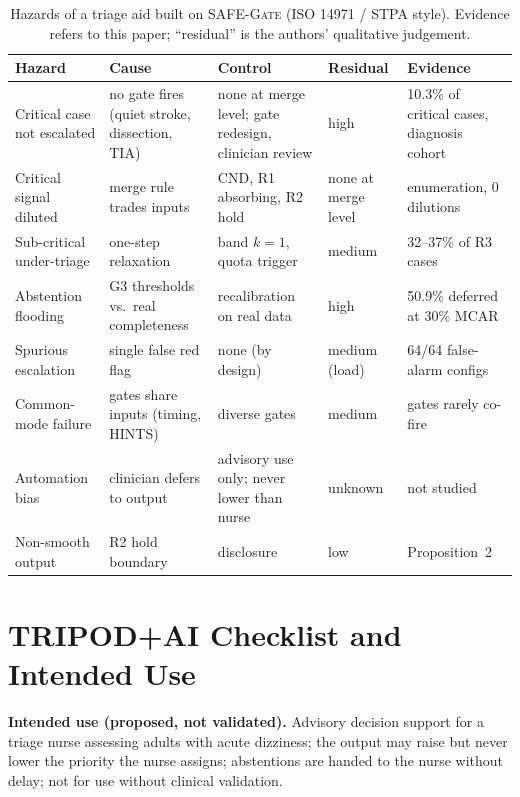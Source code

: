 \documentclass[11pt,a4paper]{article}%
\newcommand{\safegate}{\textsc{SAFE-Gate}}
\theoremstyle{plain}%
\theoremstyle{remark}%
\begin{document}
\begin{table}[h]
\caption{Hazards of a triage aid built on \safegate{} (ISO 14971 / STPA style). Evidence refers to this paper; ``residual'' is the authors' qualitative judgement.}\label{tab:hazard}
\footnotesize
\begin{tabular}{@{}p{}p{}p{}p{}p{}@{}}
\toprule
Hazard & Cause & Control & Residual & Evidence \\
\midrule
Critical case not escalated & no gate fires (quiet stroke, dissection, TIA) & none at merge level; gate redesign, clinician review & high & 10.3\% of critical cases, diagnosis cohort \\
Critical signal diluted & merge rule trades inputs & CND, R1 absorbing, R2 hold & none at merge level & enumeration, 0 dilutions \\
Sub-critical under-triage & one-step relaxation & band $k=1$, quota trigger & medium & 32--37\% of R3 cases \\
Abstention flooding & G3 thresholds vs.\ real completeness & recalibration on real data & high & 50.9\% deferred at 30\% MCAR \\
Spurious escalation & single false red flag & none (by design) & medium (load) & 64/64 false-alarm configs \\
Common-mode failure & gates share inputs (timing, HINTS) & diverse gates & medium & gates rarely co-fire \\
Automation bias & clinician defers to output & advisory use only; never lower than nurse & unknown & not studied \\
Non-smooth output & R2 hold boundary & disclosure & low & Proposition~2 \\
\bottomrule
\end{tabular}
\end{table}

\section{TRIPOD+AI Checklist and Intended Use}\label{sup:tripod}

\textbf{Intended use (proposed, not validated).} Advisory decision support for a triage nurse assessing adults with acute dizziness; the output may raise but never lower the priority the nurse assigns; abstentions are handed to the nurse without delay; not for use without clinical validation.
\end{document}
